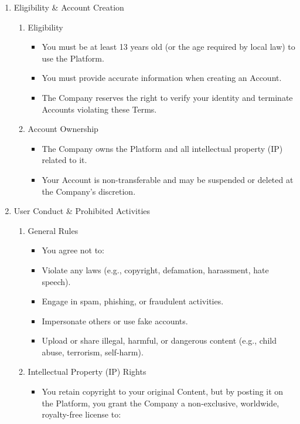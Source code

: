 \documentclass{standalone}
\begin{document}
\begin{enumerate}[label=\arabic*., noitemsep,leftmargin=*]
\begin{enumerate}[label*=\arabic*., noitemsep,leftmargin=*]
\begin{itemize}[noitemsep,leftmargin=*]
			\end{itemize}
		\end{enumerate}
		\item Eligibility \& Account Creation
		\begin{enumerate}[label*=\arabic*., noitemsep,leftmargin=*]
			\item Eligibility
			\begin{itemize}[noitemsep,leftmargin=*]
				\item [-] You must be at least 13 years old (or the age required by local law) to use the Platform. 
				\item [-] You must provide accurate information when creating an Account. 
				\item [-] The Company reserves the right to verify your identity and terminate Accounts violating these Terms.
			\end{itemize}
			\item Account Ownership
			\begin{itemize}[noitemsep,leftmargin=*]
				\item [-] The Company owns the Platform and all intellectual property (IP) related to it. 
				\item [-] Your Account is non-transferable and may be suspended or deleted at the Company’s discretion.
			\end{itemize}
		\end{enumerate}
		\item User Conduct \& Prohibited Activities
		\begin{enumerate}[label*=\arabic*., noitemsep,leftmargin=*]
			\item General Rules
			\begin{itemize}[noitemsep,leftmargin=*]
				\item [-] You agree not to: 
				\item [-] Violate any laws (e.g., copyright, defamation, harassment, hate speech). 
				\item [-] Engage in spam, phishing, or fraudulent activities. 
				\item [-] Impersonate others or use fake accounts. 
				\item [-] Upload or share illegal, harmful, or dangerous content (e.g., child abuse, terrorism, self-harm).
			\end{itemize}
			\item Intellectual Property (IP) Rights
			\begin{itemize}[noitemsep,leftmargin=*]
				\item [-] You retain copyright to your original Content, but by posting it on the Platform, you grant the Company a non-exclusive, worldwide, royalty-free license to: 

\end{itemize}
\end{enumerate}
\end{enumerate}
\end{document}
